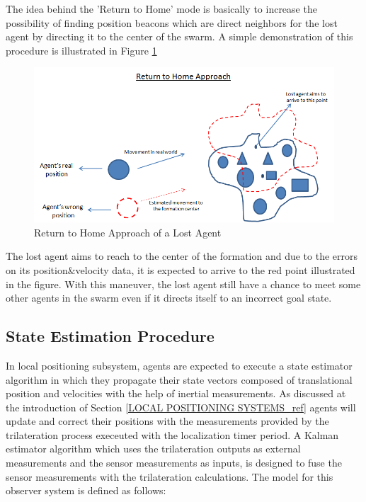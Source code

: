 The idea behind the 'Return to Home' mode is basically to increase the possibility of finding position beacons which are direct neighbors for the lost agent by directing it to the center of the swarm. A simple demonstration of this procedure is illustrated in Figure \ref{return_home_ref}
	
\begin{figure}[H]
\caption{Return to Home Approach of a Lost Agent} \label{return_home_ref}
\centering
\includegraphics[scale = 0.60]{return_home}
\end{figure}
	
The lost agent aims to reach to the center of the formation and due to the errors on its position$\&$velocity data, it is expected to arrive to the red point illustrated in the figure. With this maneuver, the lost agent still have a chance to meet some other agents in the swarm even if it directs itself to an incorrect goal state.
	
\subsection{State Estimation Procedure} \label{StateEstimationref}
In local positioning subsystem, agents are expected to execute a state estimator algorithm in which they propagate their state vectors composed of translational position and velocities with the help of inertial measurements. As discussed at the introduction of Section \ref{LOCAL POSITIONING SYSTEMS_ref} agents will update and correct their positions with the measurements provided by the trilateration process execeuted with the localization timer period. A Kalman estimator algorithm which uses the trilateration outputs as external measurements and the sensor measurements as inputs, is designed to fuse the sensor measurements with the trilateration calculations. The model for this observer system is defined as follows:
	
